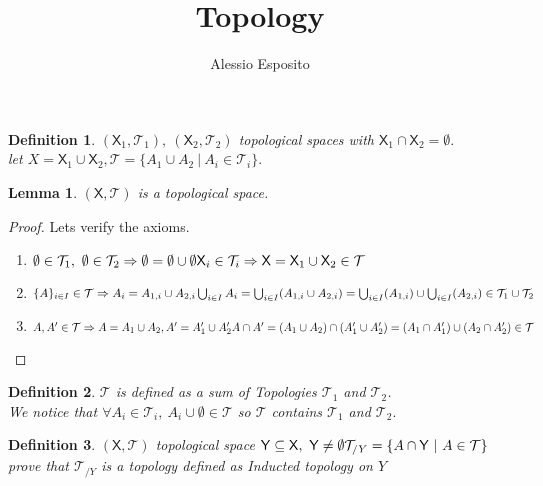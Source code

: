 \documentclass{article}
\title{Topology}
\author{Alessio Esposito}
\newtheorem{definition}{Definition}
\newtheorem{lemma}{Lemma}
\begin{document}
\maketitle

\begin{definition}
    $(\mathsf{X}_1, \mathcal{T}_1), \ (\mathsf{X}_2, \mathcal{T}_2)$ topological spaces with $\mathsf{X}_1 \cap \mathsf{X}_2 = \emptyset.$ 
     \\ let $X = \mathsf{X}_1 \cup \mathsf{X}_2, \mathcal{T} = \{ A_1 \cup A_2 \ | \ A_i \in \mathcal{T}_i \}.$
\end{definition}
    \begin{lemma}
        $(\mathsf{X}, \mathcal{T})$ is a topological space.
    \end{lemma}
    
    \begin{proof}
        Lets verify the axioms.
        \begin{enumerate}
            \item $ \emptyset \in \mathcal{T}_1, \ \emptyset \in \mathcal{T}_2 \Rightarrow \emptyset = \emptyset \cup \emptyset \\ \mathsf{X}_i \in \mathcal{T}_i \Rightarrow \mathsf{X} = \mathsf{X}_1 \cup \mathsf{X}_2 \in \mathcal{T}$
            \item $\{A\}_{i\in I} \in \mathcal{T} \Rightarrow A_i = A_{1,i} \cup A_{2,i} \\ \bigcup_{i \in I}A_i = \bigcup_{i \in I}(A_{1,i} \cup A_{2,i}) = \bigcup_{i \in I}(A_{1,i}) \cup \bigcup_{i \in I}(A_{2,i}) \in \mathcal{T}_1 \cup \mathcal{T}_2$
            \item $ A, A' \in \mathcal{T} \Rightarrow A = A_1 \cup A_2, A' = A_1' \cup A_2' \\ A \cap A' = (A_1 \cup A_2) \cap (A_1' \cup A_2') = (A_1 \cap A_1') \cup (A_2 \cap A_2') \in \mathcal{T}  $ 
        \end{enumerate}

    \end{proof}
    \begin{definition}
        $\mathcal{T}$ is defined as a sum of Topologies $\mathcal{T}_1$ and $\mathcal{T}_2$. \\ We notice that $\forall A_i \in \mathcal{T}_i, \ A_i \cup \emptyset \in \mathcal{T}$ so $\mathcal{T}$ contains $\mathcal{T}_1$ and $\mathcal{T}_2.$  

    \end{definition}
        
    \begin{definition}
        $(\mathsf{X}, \mathcal{T})$ topological space $\mathsf{Y} \subseteq \mathsf{X}, \ \mathsf{Y} \neq \emptyset \\ \mathcal{T}_{/Y} = \{ A\cap \mathsf{Y} \ | \ A \in \mathcal{T} \}$ prove that $\mathcal{T}_{/Y}$ is a topology defined as Inducted topology on $Y$
    \end{definition}
\end{document}
